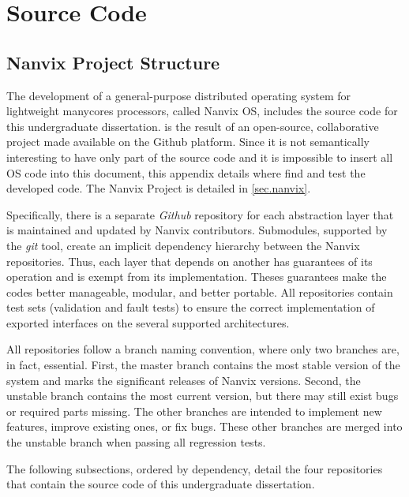 \chapter{Source Code}
\label{ch:source-code}

\renewcommand{\thefigure}{\thechapter-\arabic{figure}}
\setcounter{figure}{0}

\renewcommand{\thelisting}{\thechapter-\arabic{listing}}
\setcounter{listing}{0}

\section{Nanvix Project Structure}

	The development of a general-purpose distributed operating system for
	lightweight manycores processors, called Nanvix OS, includes the source
	code for this undergraduate dissertation. \nanvixos is the result of an
	open-source, collaborative project made available on the Github platform.
	Since it is not semantically interesting to have only part of the source
	code and it is impossible to insert all OS code into this document, this
	appendix details where find and test the developed code. The Nanvix
	Project is detailed in \autoref{sec.nanvix}.

	Specifically, there is a separate \textit{Github} repository for each abstraction
	layer that is maintained and updated by Nanvix contributors. Submodules,
	supported by the \textit{git} tool, create an implicit dependency hierarchy
	between the Nanvix repositories. Thus, each layer that depends on another
	has guarantees of its operation and is exempt from its implementation.
	Theses guarantees make the codes better manageable, modular, and better
	portable. All repositories contain test sets (validation and fault tests)
	to ensure the correct implementation of exported interfaces on the several
	supported architectures.

	All repositories follow a branch naming convention, where only two
	branches are, in fact, essential. First, the master branch contains
	the most stable version of the system and marks the significant
	releases of Nanvix versions. Second, the unstable branch contains
	the most current version, but there may still exist bugs or required
	parts missing. The other branches are intended to implement new features,
	improve existing ones, or fix bugs. These other branches are merged
	into the unstable branch when passing all regression tests.

	The following subsections, ordered by dependency, detail the four
	repositories that contain the source code of this undergraduate dissertation.

